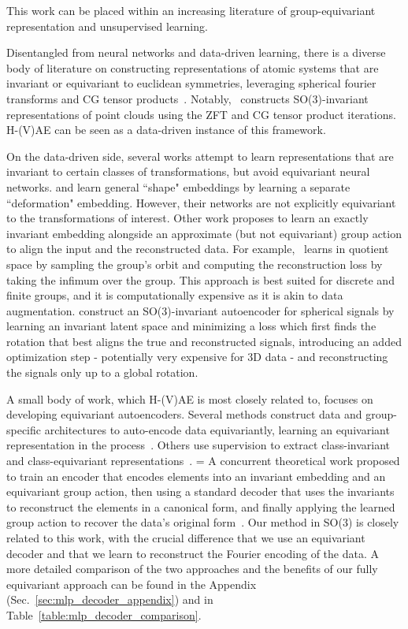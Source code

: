 This work can be placed within an increasing literature of group-equivariant representation and unsupervised
learning.

Disentangled from neural networks and data-driven learning, there is a diverse body of literature on
constructing representations of atomic systems that are invariant or equivariant to euclidean symmetries,
leveraging spherical fourier transforms and CG tensor products~\citep{drautz_atomic_2019,
musil_physics-inspired_2021}. Notably,~\citet{uhrin_through_2021} constructs SO(3)-invariant representations
of point clouds using the ZFT and CG tensor product iterations. H-(V)AE can be seen as a data-driven instance
of this framework.

On the data-driven side, several works attempt to learn representations that are invariant to certain classes
of transformations, but avoid equivariant neural networks. \citet{shu_deforming_2018} and 
\citet{koneripalli_rate-invariant_2020} learn general ``shape"
embeddings by learning a separate ``deformation" embedding. However, their networks are not
explicitly equivariant to the transformations of interest.
Other work proposes to learn an exactly invariant embedding alongside an approximate (but not
equivariant) group action to align the input and the reconstructed data. For
example,~\citet{mehr_manifold_2018} learns in quotient space by sampling the group's orbit and
computing the reconstruction loss by taking the infimum over the group. This approach is best
suited for discrete and finite groups, and it is computationally expensive as it is akin to data
augmentation. \citet{lohit_rotation-invariant_2020} construct an SO(3)-invariant autoencoder for
spherical signals by learning an invariant latent space and minimizing a loss which first finds the
rotation that best aligns the true and reconstructed signals, introducing an added optimization
step - potentially very expensive for 3D data - and reconstructing the signals only up to a global
rotation.

A small body of work, which H-(V)AE is most closely related to, focuses on developing equivariant
autoencoders. Several methods construct data and group-specific architectures to auto-encode data
equivariantly, learning an equivariant representation in the process~\citep{hinton_transforming_2011,
kosiorek_stacked_2019}. Others use supervision to extract
class-invariant and class-equivariant representations~\citep{feige_invariant-equivariant_2022}. =
A concurrent theoretical work proposed to train an encoder that encodes elements into an invariant
embedding and an equivariant group action, then using a standard decoder that uses the invariants
to reconstruct the elements in a canonical form, and finally applying the learned group action to
recover the data's original form~\citep{winter_unsupervised_2022}.
Our method in SO(3) is closely related to this work, with the crucial difference that we use an
equivariant decoder and that we learn to reconstruct the Fourier encoding of the data. A more
detailed comparison of the two approaches and the benefits of our fully equivariant approach can be
found in the Appendix (Sec.~\ref{sec:mlp_decoder_appendix}) and in Table~\ref{table:mlp_decoder_comparison}.


